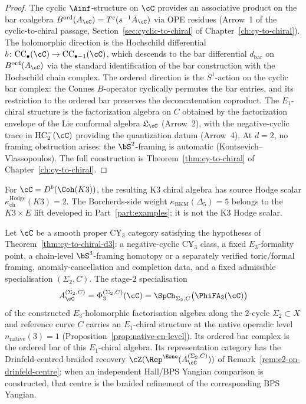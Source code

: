 \begin{proof}
The cyclic $\Ainf$-structure on $\cC$ provides an associative product on the bar coalgebra $B^{\mathrm{ord}}(A_\cC) = T^c(s^{-1}\bar{A}_\cC)$ via OPE residues (Arrow~1 of the cyclic-to-chiral passage, Section~\ref{sec:cyclic-to-chiral} of Chapter~\ref{ch:cy-to-chiral}). The holomorphic direction is the Hochschild differential $b \colon \mathrm{CC}_\bullet(\cC) \to \mathrm{CC}_{\bullet-1}(\cC)$, which descends to the bar differential $d_{\mathrm{bar}}$ on $B^{\mathrm{ord}}(A_\cC)$ via the standard identification of the bar construction with the Hochschild chain complex. The ordered direction is the $S^1$-action on the cyclic bar complex: the Connes $B$-operator cyclically permutes the bar entries, and its restriction to the ordered bar preserves the deconcatenation coproduct. The $E_1$-chiral structure is the factorization algebra on $C$ obtained by the factorization envelope of the Lie conformal algebra $\mathfrak{L}_\cC$ (Arrow~2), with the negative-cyclic trace in $\mathrm{HC}^-_2(\cC)$ providing the quantization datum (Arrow~4). At $d=2$, no framing obstruction arises: the $\bS^2$-framing is automatic (Kontsevich--Vlassopoulos). The full construction is Theorem~\ref{thm:cy-to-chiral} of Chapter~\ref{ch:cy-to-chiral}.
\end{proof}

For $\cC = D^b(\Coh(K3))$, the resulting K3 chiral algebra has source Hodge scalar $\kappa_{\mathrm{ch}}^{\mathrm{Hodge}}(K3) = 2$. The Borcherds-side weight $\kappa_{\mathrm{BKM}}(\Delta_5) = 5$ belongs to the $K3 \times E$ lift developed in Part~\ref{part:examples}; it is not the K3 Hodge scalar.

\begin{theorem}[\texorpdfstring{$E_1$}{E-1} sector at \texorpdfstring{$d=3$}{d=3}]
\label{thm:e1-sector-d3}
Let $\cC$ be a smooth proper CY$_3$ category satisfying the hypotheses of Theorem~\ref{thm:cy-to-chiral-d3}: a negative-cyclic CY$_3$ class, a fixed $E_3$-formality point, a chain-level $\bS^3$-framing homotopy or a separately verified toric/formal framing, anomaly-cancellation and completion data, and a fixed admissible specialisation $(\Sigma_2,C)$. The stage-$2$ specialisation
\[
 A_\cC^{(\Sigma_2,C)}
 =
 \Phi_3^{(\Sigma_2,C)}(\cC)
 =
 \SpCh_{\Sigma_2,C}\bigl(\PhiFA_3(\cC)\bigr)
\]
of the constructed $E_3$-holomorphic factorisation algebra along the
$2$-cycle $\Sigma_2\subset X$ and reference curve $C$ carries an
$E_1$-chiral structure at the native operadic level
$n_{\mathrm{native}}(3)=1$ (Proposition~\ref{prop:native-en-level}).
Its ordered bar complex is the ordered bar of this $E_1$-chiral
algebra. Its representation category has the Drinfeld-centred braided
recovery \(\cZ(\Rep^{\Eone}(A_\cC^{(\Sigma_2,C)}))\) of
Remark~\ref{rem:e2-on-drinfeld-centre}; when an independent Hall/BPS
Yangian comparison is constructed, that centre is the braided
refinement of the corresponding BPS Yangian.
\end{theorem}

